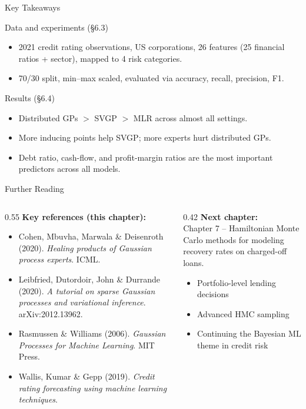 \documentclass[aspectratio=169,10pt]{beamer}
\begin{document}
\begin{frame}[allowframebreaks]{Key Takeaways}
  \begin{block}{Data and experiments (\S6.3)}
    \begin{itemize}
      \item 2021 credit rating observations, US corporations, 26 features
            (25 financial ratios + sector), mapped to 4 risk categories.
      \item 70/30 split, min--max scaled, evaluated via accuracy, recall,
            precision, F1.
    \end{itemize}
  \end{block}
  \begin{block}{Results (\S6.4)}
    \begin{itemize}
      \item Distributed GPs $>$ SVGP $>$ MLR across almost all settings.
      \item More inducing points help SVGP; more experts hurt distributed
            GPs.
      \item Debt ratio, cash-flow, and profit-margin ratios are the most
            important predictors across all models.
    \end{itemize}
  \end{block}
\end{frame}

\begin{frame}{Further Reading}
  \begin{columns}[T]
    \begin{column}{0.55\textwidth}
      \textbf{Key references (this chapter):}
      \begin{itemize}
        \item Cohen, Mbuvha, Marwala \& Deisenroth (2020). \emph{Healing
              products of Gaussian process experts}. ICML.
        \item Leibfried, Dutordoir, John \& Durrande (2020). \emph{A tutorial
              on sparse Gaussian processes and variational inference}.
              arXiv:2012.13962.
        \item Rasmussen \& Williams (2006). \emph{Gaussian Processes for
              Machine Learning}. MIT Press.
        \item Wallis, Kumar \& Gepp (2019). \emph{Credit rating forecasting
              using machine learning techniques}.
      \end{itemize}
    \end{column}
    \begin{column}{0.42\textwidth}
      \textbf{Next chapter:}\\
      Chapter 7 -- Hamiltonian Monte Carlo methods for modeling recovery
      rates on charged-off loans.
      \vspace{0.5em}
      \begin{itemize}
        \item Portfolio-level lending decisions
        \item Advanced HMC sampling
        \item Continuing the Bayesian ML theme in credit risk
      \end{itemize}
    \end{column}
  \end{columns}
\end{frame}
\end{document}
